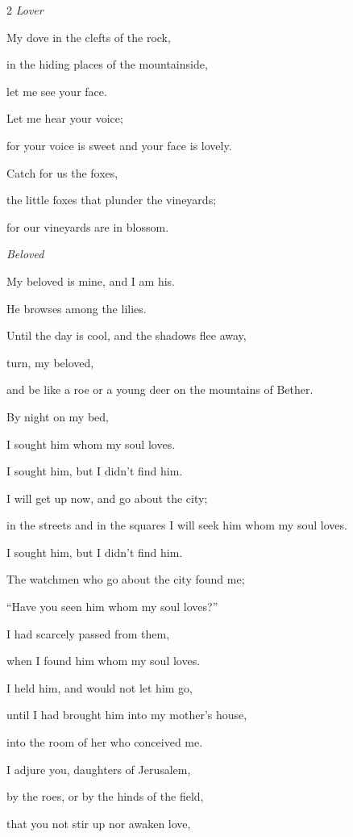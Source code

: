 \begin{multicols}{2}
\textit{Lover}

\myverse{}My dove in the clefts of the rock,

in the hiding places of the mountainside,

let me see your face.

Let me hear your voice;

for your voice is sweet and your face is lovely.

\myverse{}Catch for us the foxes,

the little foxes that plunder the vineyards;

for our vineyards are in blossom.


\textit{Beloved}

\myverse{}My beloved is mine, and I am his.

He browses among the lilies.

\myverse{}Until the day is cool, and the shadows flee away,

turn, my beloved,

and be like a roe or a young deer on the mountains of Bether.


\mychapter{} \myverse*{}By night on my bed,

I sought him whom my soul loves.

I sought him, but I didn’t find him.

\myverse{}I will get up now, and go about the city;

in the streets and in the squares I will seek him whom my soul loves.

I sought him, but I didn’t find him.

\myverse{}The watchmen who go about the city found me;

“Have you seen him whom my soul loves?”

\myverse{}I had scarcely passed from them,

when I found him whom my soul loves.

I held him, and would not let him go,

until I had brought him into my mother’s house,

into the room of her who conceived me.

\vspace{\baselineskip} 

\myverse{}I adjure you, daughters of Jerusalem,

by the roes, or by the hinds of the field,

that you not stir up nor awaken love,


\end{multicols}
